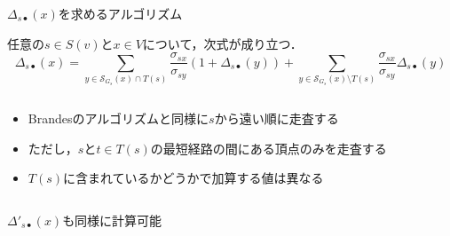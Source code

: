 \documentclass[dvipdfmx,fleqn]{beamer}
\begin{document}
\begin{frame}{$\Delta_{s\bullet}(x)$を求めるアルゴリズム}
  
  \begin{theorem}\small
    任意の$s\in S(v)$と$x\in V$について，次式が成り立つ．
    \begin{equation*}
      \Delta_{s\bullet}(x)
      =\sum_{y\in\mathcal{S}_{G_s}(x)\cap T(s)}\frac{\sigma_{sx}}{\sigma_{sy}}(1+\Delta_{s\bullet}(y))
      +\sum_{y\in\mathcal{S}_{G_s}(x)\setminus T(s)}\frac{\sigma_{sx}}{\sigma_{sy}}\Delta_{s\bullet}(y)
    \end{equation*}
  \end{theorem}
  \begin{columns}
    \begin{column}{.49\textwidth}
      \begin{itemize}
      \item Brandesのアルゴリズムと同様に$s$から遠い順に走査する
      \item ただし，$s$と$t\in T(s)$の最短経路の間にある頂点のみを走査する
      \item $T(s)$に含まれているかどうかで加算する値は異なる
      \end{itemize}
    \end{column}
    \begin{column}{.49\textwidth}
      \centering
      \def\svgwidth{.9\columnwidth}
      
    \end{column}
  \end{columns}
  $\Delta'_{s\bullet}(x)$も同様に計算可能
\end{frame}
\end{document}
